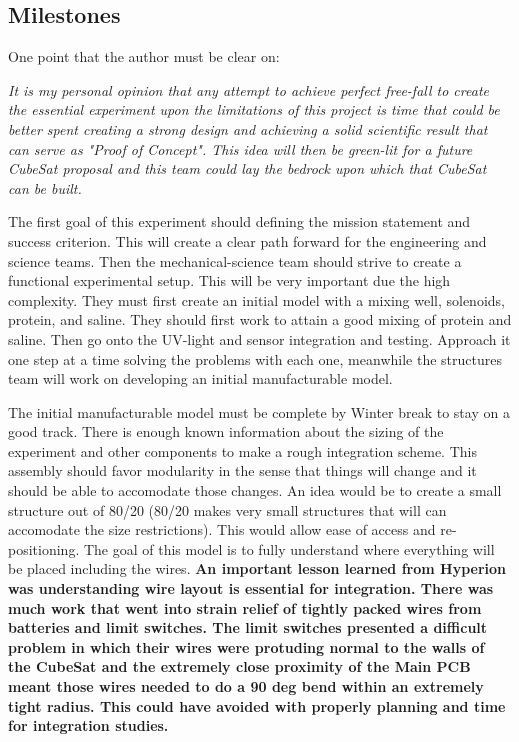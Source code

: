 \documentclass[conference]{IEEEtran} %
\begin{document}
\subsection{Milestones}
\label{subsec:milestones}

  One point that the author must be clear on:

  \textit{It is my personal opinion that any attempt to achieve perfect free-fall to create the essential experiment upon the limitations of this project is time that 
  could be better spent creating a strong design and achieving a solid scientific result that can serve as "Proof of Concept". This idea will then be green-lit for a future 
  CubeSat proposal and this team could lay the bedrock upon which that CubeSat can be built.}

  The first goal of this experiment should defining the mission statement and success criterion. This will create a clear path forward for the engineering and science teams.
  Then the mechanical-science team should strive to create a functional experimental setup. This will be very important due the high complexity. They must first create an initial 
  model with a mixing well, solenoids, protein, and saline. They should first work to attain a good mixing of protein and saline. Then go onto the UV-light and sensor integration and testing. 
  Approach it one step at a time solving the problems with each one, meanwhile the structures team will work on developing an initial manufacturable model.

  The initial manufacturable model must be complete by Winter break to stay on a good track. There is enough known information about the sizing of the experiment and other components 
  to make a rough integration scheme. This assembly should favor modularity in the sense that things will change and it should be able to accomodate those changes. An idea would be 
  to create a small structure out of 80/20 (80/20 makes very small structures that will can accomodate the size restrictions). This would allow ease of access and re-positioning. 
  The goal of this model is to fully understand where everything will be placed including the wires. \textbf{An important lesson learned from Hyperion was understanding wire layout is 
  essential for integration. There was much work that went into strain relief of tightly packed wires from batteries and limit switches. The limit switches presented a difficult problem 
  in which their wires were protuding normal to the walls of the CubeSat and the extremely close proximity of the Main PCB meant those wires needed to do a 90 deg bend within an extremely 
  tight radius. This could have avoided with properly planning and time for integration studies.}
\end{document}
